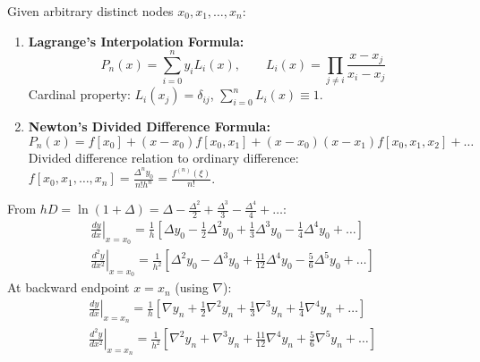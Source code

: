 \begin{theorembox}
Given arbitrary distinct nodes $x_0, x_1, \dots, x_n$:
\begin{enumerate}[label=\textbf{\arabic*.},noitemsep]
    \item \textbf{Lagrange's Interpolation Formula:}
    \begin{equation}
        \boxed{P_n(x) = \sum_{i=0}^n y_i L_i(x)}, \qquad \boxed{L_i(x) = \prod_{j \ne i} \frac{x - x_j}{x_i - x_j}}
    \end{equation}
    Cardinal property: $L_i(x_j) = \delta_{ij}$, $\sum_{i=0}^n L_i(x) \equiv 1$.
    \item \textbf{Newton's Divided Difference Formula:}
    \begin{equation}
        \boxed{P_n(x) = f[x_0] + (x - x_0) f[x_0, x_1] + (x - x_0)(x - x_1) f[x_0, x_1, x_2] + \dots}
    \end{equation}
    Divided difference relation to ordinary difference: $f[x_0, x_1, \dots, x_n] = \frac{\Delta^n y_0}{n! h^n} = \frac{f^{(n)}(\xi)}{n!}$.
\end{enumerate}
\end{theorembox}

\begin{theorembox}
From $h D = \ln(1 + \Delta) = \Delta - \frac{\Delta^2}{2} + \frac{\Delta^3}{3} - \frac{\Delta^4}{4} + \dots$:
\begin{align}
    \boxed{\left. \frac{dy}{dx} \right|_{x=x_0} = \frac{1}{h} \left[ \Delta y_0 - \frac{1}{2} \Delta^2 y_0 + \frac{1}{3} \Delta^3 y_0 - \frac{1}{4} \Delta^4 y_0 + \dots \right]} \\
    \boxed{\left. \frac{d^2 y}{dx^2} \right|_{x=x_0} = \frac{1}{h^2} \left[ \Delta^2 y_0 - \Delta^3 y_0 + \frac{11}{12} \Delta^4 y_0 - \frac{5}{6} \Delta^5 y_0 + \dots \right]}
\end{align}
At backward endpoint $x = x_n$ (using $\nabla$):
\begin{align}
    \boxed{\left. \frac{dy}{dx} \right|_{x=x_n} = \frac{1}{h} \left[ \nabla y_n + \frac{1}{2} \nabla^2 y_n + \frac{1}{3} \nabla^3 y_n + \frac{1}{4} \nabla^4 y_n + \dots \right]} \\
    \boxed{\left. \frac{d^2 y}{dx^2} \right|_{x=x_n} = \frac{1}{h^2} \left[ \nabla^2 y_n + \nabla^3 y_n + \frac{11}{12} \nabla^4 y_n + \frac{5}{6} \nabla^5 y_n + \dots \right]}
\end{align}
\end{theorembox}

